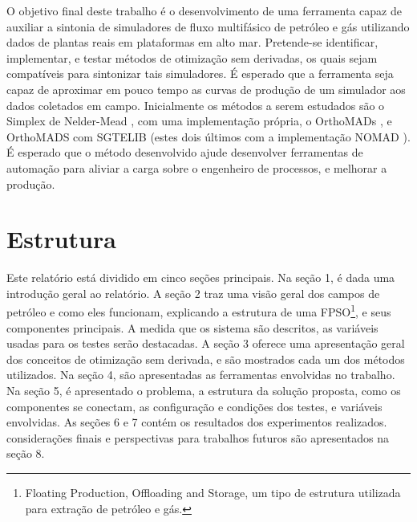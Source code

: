 O objetivo final deste trabalho é o desenvolvimento de uma ferramenta capaz de auxiliar a sintonia de simuladores de fluxo multifásico de petróleo e gás utilizando dados de plantas reais em plataformas em alto mar. 
%
Pretende-se identificar, implementar, e testar métodos de otimização sem derivadas, os quais sejam compatíveis para sintonizar tais simuladores.
%
É esperado que a ferramenta seja capaz de aproximar em pouco tempo as curvas de produção de um simulador aos dados coletados em campo.
%
Inicialmente os métodos a serem estudados são o Simplex de Nelder-Mead \cite{Singer:2009}, com uma implementação própria, o OrthoMADs \cite{DBLP:journals/siamjo/AbramsonADD09}, e OrthoMADS com SGTELIB (estes dois últimos com a implementação NOMAD \cite{Nomad}).
%
É esperado que o método desenvolvido ajude desenvolver ferramentas de automação para aliviar a carga sobre o engenheiro de processos, e melhorar a produção.
%

%
\section{Estrutura}

Este relatório está dividido em cinco seções principais.
%
Na seção 1, é dada uma introdução geral ao relatório.
%
A seção 2 traz uma visão geral dos campos de petróleo e como eles funcionam, explicando a estrutura de uma FPSO\footnote{Floating Production, Offloading and Storage, um tipo de estrutura utilizada para extração de petróleo e gás.}, e seus componentes principais. 
%
A medida que os sistema são descritos, as variáveis usadas para os testes serão destacadas.
%
A seção 3 oferece uma apresentação geral dos conceitos de otimização sem derivada, e são mostrados cada um dos métodos utilizados.
%
Na seção 4, são apresentadas as ferramentas envolvidas no trabalho.
%
Na seção 5, é apresentado o problema, a estrutura da solução proposta, como os componentes se conectam, as configuração e condições dos testes, e variáveis envolvidas.
%
As seções 6 e 7 contém os resultados dos experimentos realizados.
%
considerações finais e perspectivas para trabalhos futuros são apresentados na seção 8.

 

